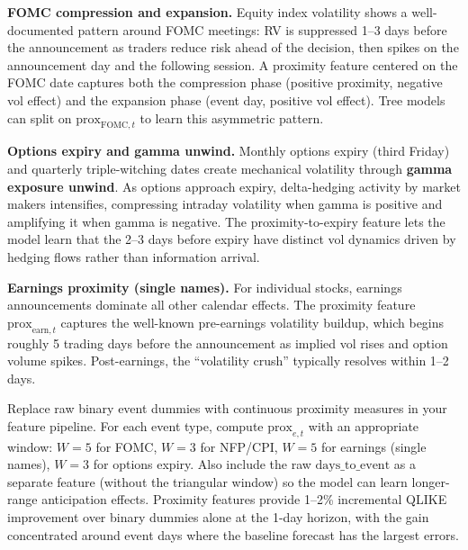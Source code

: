 \textbf{FOMC compression and expansion.}
Equity index volatility shows a well-documented pattern around FOMC meetings: RV is suppressed 1--3 days before the announcement as traders reduce risk ahead of the decision, then spikes on the announcement day and the following session.
A proximity feature centered on the FOMC date captures both the compression phase (positive proximity, negative vol effect) and the expansion phase (event day, positive vol effect).
Tree models can split on $\text{prox}_{\text{FOMC},t}$ to learn this asymmetric pattern.

\textbf{Options expiry and gamma unwind.}
Monthly options expiry (third Friday) and quarterly triple-witching dates create mechanical volatility through \textbf{gamma exposure unwind}.
As options approach expiry, delta-hedging activity by market makers intensifies, compressing intraday volatility when gamma is positive and amplifying it when gamma is negative.
The proximity-to-expiry feature lets the model learn that the 2--3 days before expiry have distinct vol dynamics driven by hedging flows rather than information arrival.

\textbf{Earnings proximity (single names).}
For individual stocks, earnings announcements dominate all other calendar effects.
The proximity feature $\text{prox}_{\text{earn},t}$ captures the well-known pre-earnings volatility buildup, which begins roughly 5 trading days before the announcement as implied vol rises and option volume spikes.
Post-earnings, the ``volatility crush'' typically resolves within 1--2 days.

\begin{projectconnection}
Replace raw binary event dummies with continuous proximity measures in your feature pipeline.
For each event type, compute $\text{prox}_{e,t}$ with an appropriate window: $W = 5$ for FOMC, $W = 3$ for NFP/CPI, $W = 5$ for earnings (single names), $W = 3$ for options expiry.
Also include the raw $\text{days\_to\_event}$ as a separate feature (without the triangular window) so the model can learn longer-range anticipation effects.
Proximity features provide 1--2\% incremental QLIKE improvement over binary dummies alone at the 1-day horizon, with the gain concentrated around event days where the baseline forecast has the largest errors.
\end{projectconnection}

